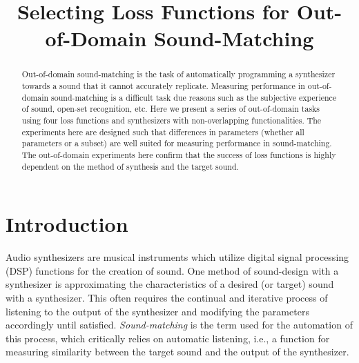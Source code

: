 \documentclass{article} %
\title{Selecting Loss Functions for Out-of-Domain Sound-Matching}
\begin{document}

\address{University of Alberta}

\maketitle


\begin{abstract}
 Out-of-domain sound-matching is the task of automatically programming a synthesizer towards a sound that it cannot accurately replicate. Measuring performance in out-of-domain sound-matching is a difficult task due reasons such as the subjective experience of sound, open-set recognition, etc. Here we present a series of out-of-domain tasks using four loss functions and synthesizers with non-overlapping functionalities. The experiments here are designed such that differences in parameters (whether all parameters or a subset) are well suited for measuring performance in sound-matching. The out-of-domain experiments here confirm that the success of loss functions is highly dependent on the method of synthesis and the target sound. 
\end{abstract}

\section{Introduction}
Audio synthesizers are musical instruments which utilize digital signal processing (DSP) functions for the creation of sound.  One method of sound-design with a synthesizer is approximating the characteristics of a desired (or target) sound with a synthesizer. This often requires the continual and iterative process of listening to the output of the synthesizer and modifying the parameters accordingly until satisfied. \textit{Sound-matching} is the term used for the automation of this process, which critically relies on automatic listening, i.e., a function for measuring similarity between the target sound and the output of the synthesizer. 
\end{document}
